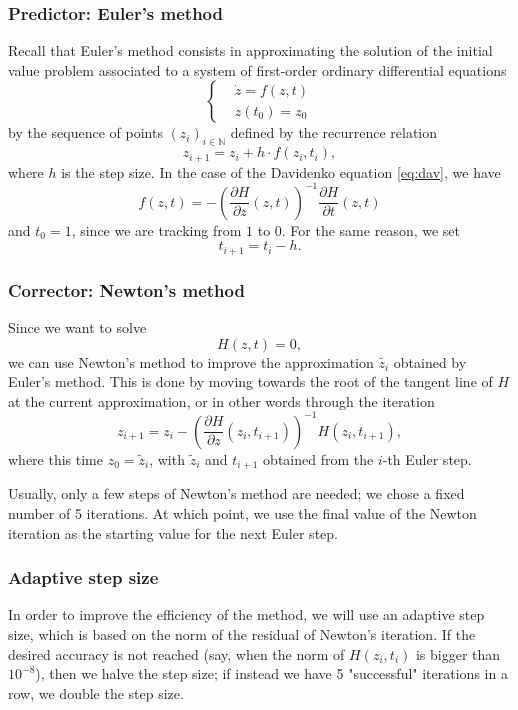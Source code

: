 \documentclass[a4paper]{article}
\newcommand{\N}{\mathbb{N}}
\theoremstyle{definition}
\theoremstyle{definition}
\theoremstyle{remark}
\theoremstyle{definition}
\begin{document}
\subsubsection{Predictor: Euler's method}
Recall that Euler's method consists in approximating the solution of the initial value problem associated to a system of first-order ordinary differential equations
\begin{equation*}
    \left\{
    \begin{aligned}
         & \dot{z}=f(z,t) \\
         & z(t_0)=z_0
    \end{aligned}
    \right.
\end{equation*}
by the sequence of points $(z_i)_{i\in\N}$ defined by the recurrence relation
$$ z_{i+1}=z_i+h\cdot f(z_i,t_i) ,$$
where $h$ is the step size.
In the case of the Davidenko equation \eqref{eq:dav}, we have
$$f(z,t)=-\left(\frac{\partial H}{\partial z}(z,t)\right)^{-1}\frac{\partial H}{\partial t}(z,t)$$ and $t_0=1$, since we are tracking from $1$ to $0$. For the same
reason, we set $$t_{i+1}=t_i-h.$$
\subsubsection{Corrector: Newton's method}
Since we want to solve $$H(z,t)=0,$$ we can use Newton's method to improve the approximation $\widetilde{z_i}$ obtained by Euler's method.
This is done by moving towards the root of the tangent line of $H$ at the current approximation, or in other words through the iteration
$$ z_{i+1}=z_i-\left(\frac{\partial H}{\partial z}(z_i,t_{i+1})\right)^{-1}H(z_i,t_{i+1}) ,$$
where this time $z_0=\widetilde{z}_i$, with $\widetilde{z}_i$ and $t_{i+1}$ obtained from the $i$-th Euler step.

Usually, only a few steps of Newton's method are needed; we chose a fixed number of 5 iterations.
At which point, we use the final value of the Newton iteration as the starting value for the next Euler step.
\subsubsection{Adaptive step size}
In order to improve the efficiency of the method, we will use an adaptive step size, which is based on the norm of the residual of Newton's iteration.
If the desired accuracy is not reached (say, when the norm of $H(z_i,t_i)$ is bigger than $10^{-8}$),
then we halve the step size; if instead we have 5 "successful" iterations in a row, we double the step size.
\end{document}

